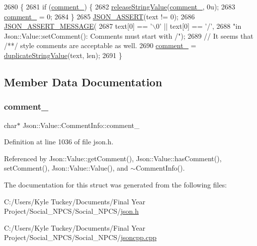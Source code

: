 \begin{DoxyCode}
2680                                                               \{
2681   \textcolor{keywordflow}{if} (\hyperlink{struct_json_1_1_value_1_1_comment_info_a020f19c7098bab8ec8fec14cd1a5afb9}{comment\_}) \{
2682     \hyperlink{namespace_json_a3e0d81d514d0e8bddf33b08074214abd}{releaseStringValue}(\hyperlink{struct_json_1_1_value_1_1_comment_info_a020f19c7098bab8ec8fec14cd1a5afb9}{comment\_}, 0u);
2683     \hyperlink{struct_json_1_1_value_1_1_comment_info_a020f19c7098bab8ec8fec14cd1a5afb9}{comment\_} = 0;
2684   \}
2685   \hyperlink{json_8h_a188941dcc789ccb6539c3d6f41405582}{JSON\_ASSERT}(text != 0);
2686   \hyperlink{json_8h_ad7facdeeca0f495765e3b204c265eadb}{JSON\_ASSERT\_MESSAGE}(
2687       text[0] == \textcolor{charliteral}{'\(\backslash\)0'} || text[0] == \textcolor{charliteral}{'/'},
2688       \textcolor{stringliteral}{"in Json::Value::setComment(): Comments must start with /"});
2689   \textcolor{comment}{// It seems that /**/ style comments are acceptable as well.}
2690   \hyperlink{struct_json_1_1_value_1_1_comment_info_a020f19c7098bab8ec8fec14cd1a5afb9}{comment\_} = \hyperlink{namespace_json_a678ac3a60cd70ec0fb4c9abfd40eb0c4}{duplicateStringValue}(text, len);
2691 \}
\end{DoxyCode}


\subsection{Member Data Documentation}
\mbox{\label{struct_json_1_1_value_1_1_comment_info_a020f19c7098bab8ec8fec14cd1a5afb9}} 
\subsubsection{\texorpdfstring{comment\+\_\+}{comment\_}}
{\footnotesize\ttfamily char$\ast$ Json\+::\+Value\+::\+Comment\+Info\+::comment\+\_\+}



Definition at line 1036 of file json.\+h.



Referenced by Json\+::\+Value\+::get\+Comment(), Json\+::\+Value\+::has\+Comment(), set\+Comment(), Json\+::\+Value\+::\+Value(), and $\sim$\+Comment\+Info().



The documentation for this struct was generated from the following files\+:\begin{DoxyCompactItemize}
\item 
C\+:/\+Users/\+Kyle Tuckey/\+Documents/\+Final Year Project/\+Social\+\_\+\+N\+P\+C\+S/\+Social\+\_\+\+N\+P\+C\+S/\hyperlink{json_8h}{json.\+h}\item 
C\+:/\+Users/\+Kyle Tuckey/\+Documents/\+Final Year Project/\+Social\+\_\+\+N\+P\+C\+S/\+Social\+\_\+\+N\+P\+C\+S/\hyperlink{jsoncpp_8cpp}{jsoncpp.\+cpp}\end{DoxyCompactItemize}
